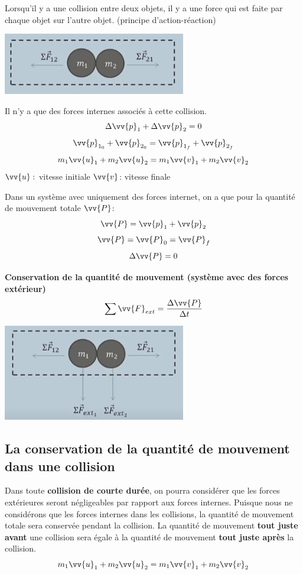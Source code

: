 \documentclass{article}
\begin{document}
Lorsqu'il y a une collision entre deux objets, il y a une force qui est faite par chaque objet sur l'autre objet. (principe d'action-réaction)
\begin{center}
    \includegraphics[width=8cm]{Image/Collision.png}
\end{center}
Il n'y a que des forces internes associés à cette collision.
\noindent
\[\Delta\vv{p}_1 + \Delta\vv{p}_2 = 0\]
\[\vv{p}_{1_0} + \vv{p}_{2_0} = \vv{p}_{1_f} + \vv{p}_{2_f} \]
\[m_1\vv{u}_1 + m_2\vv{u}_2 = m_1\vv{v}_1 + m_2\vv{v}_2\]
\noindent
$\vv{u}:$ vitesse initiale
\newline
$\vv{v}$: vitesse finale
\newline

Dans un système avec uniquement des forces internet, on a que pour la quantité de mouvement totale $\vv{P}$: 
\[\vv{P} = \vv{p}_1 + \vv{p}_2\]
\[\vv{P} = \vv{P}_0 = \vv{P}_f\]
\[\Delta\vv{P} = 0 \]
\newline

\noindent
\textbf{Conservation de la quantité de mouvement (système avec des forces extérieur)}
\newline
\[\sum \vv{F}_{ext} = \frac{\Delta \vv{P}}{\Delta t}\]
\begin{center}
    \includegraphics[width=8cm]{Image/CollisionFext.png}
\end{center}



\subsection{La conservation de la quantité de mouvement dans une collision}
Dans toute \textbf{collision de courte durée}, on pourra considérer que les forces extérieures seront négligeables par rapport aux forces internes.
\newline
Puisque nous ne considérons que les forces internes dans les collisions, la quantité de mouvement totale sera conservée pendant la collision.
\newline
La quantité de mouvement \textbf{tout juste avant} une collision sera égale à la quantité de mouvement \textbf{tout juste après} la collision.
\[m_1\vv{u}_1 + m_2\vv{u}_2 = m_1\vv{v}_1 + m_2\vv{v}_2\]
\newline
\end{document}

